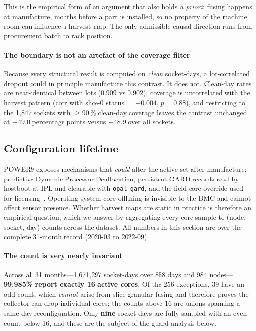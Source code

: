 \documentclass[10pt,conference]{IEEEtran}
\begin{document}
This is the empirical form of an argument that also holds \emph{a priori}: fusing happens at
manufacture, months before a part is installed, so no property of the machine room can influence a
harvest map. The only admissible causal direction runs from procurement batch to rack position.

\paragraph*{The boundary is not an artefact of the coverage filter} Because every structural
result is computed on \emph{clean} socket-days, a lot-correlated dropout could in principle
manufacture this contrast. It does not. Clean-day rates are near-identical between lots (0.909 vs
0.902), coverage is uncorrelated with the harvest pattern (corr with slice-0 status $=+0.004$,
$p=0.88$), and restricting to the 1{,}847 sockets with $\ge$90\,\% clean-day coverage leaves the
contrast unchanged at $+49.0$ percentage points versus $+48.9$ over all sockets.

\subsection{Configuration lifetime}
\label{sec:lifecycle}
POWER9 exposes mechanisms that \emph{could} alter the active set after manufacture: predictive
Dynamic Processor Deallocation, persistent GARD records read by hostboot at IPL and clearable with
\texttt{opal-gard}, and the field core override used for licensing~\cite{ibm_deconfig,skiboot_gard}.
Operating-system core offlining is invisible to the BMC and cannot affect sensor presence. Whether
harvest maps are static in practice is therefore an empirical question, which we answer by
aggregating every core sample to (node, socket, day) counts across the dataset.
All numbers in this section are over the complete 31-month record (2020-03 to 2022-09).

\paragraph{The count is very nearly invariant} Across all 31 months---1{,}671{,}297 socket-days
over 858 days and 984 nodes---\textbf{99.985\% report exactly 16 active cores}. Of the 256
exceptions, 39 have an odd count, which \emph{cannot} arise from slice-granular fusing and
therefore proves the collector can drop individual cores; the counts above 16 are unions spanning a
same-day reconfiguration. Only \textbf{nine} socket-days are fully-sampled with an even count below
16, and these are the subject of the guard analysis below.
\end{document}
